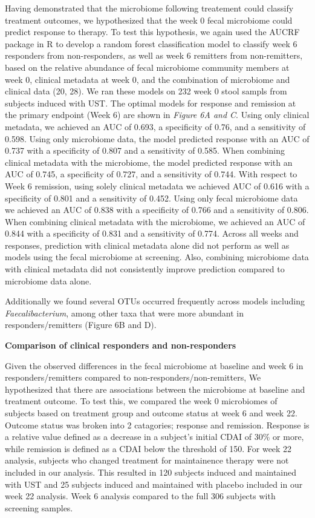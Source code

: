 \documentclass[11pt,]{article}
\begin{document}
Having demonstrated that the microbiome following treatement could
classify treatment outcomes, we hypothesized that the week 0 fecal
microbiome could predict response to therapy. To test this hypothesis,
we again used the AUCRF package in R to develop a random forest
classification model to classify week 6 responders from non-responders,
as well as week 6 remitters from non-remitters, based on the relative
abundance of fecal microbiome community members at week 0, clinical
metadata at week 0, and the combination of microbiome and clinical data
(20, 28). We ran these models on 232 week 0 stool sampls from subjects
induced with UST. The optimal models for response and remission at the
primary endpoint (Week 6) are shown in \emph{Figure 6A and C}. Using
only clinical metadata, we achieved an AUC of 0.693, a specificity of
0.76, and a sensitivity of 0.598. Using only microbiome data, the model
predicted response with an AUC of 0.737 with a specificity of 0.807 and
a sensitivity of 0.585. When combining clinical metadata with the
microbiome, the model predicted response with an AUC of 0.745, a
specificity of 0.727, and a sensitivity of 0.744. With respect to Week 6
remission, using solely clinical metadata we achieved AUC of 0.616 with
a specificity of 0.801 and a sensitivity of 0.452. Using only fecal
microbiome data we achieved an AUC of 0.838 with a specificity of 0.766
and a sensitivity of 0.806. When combining clinical metadata with the
microbiome, we achieved an AUC of 0.844 with a specificity of 0.831 and
a sensitivity of 0.774. Across all weeks and responses, prediction with
clinical metadata alone did not perform as well as models using the
fecal microbiome at screening. Also, combining microbiome data with
clinical metadata did not consistently improve prediction compared to
microbiome data alone.

Additionally we found several OTUs occurred frequently across models
including \emph{Faecalibacterium}, among other taxa that were more
abundant in responders/remitters (Figure 6B and D).

\textbf{Comparison of clinical responders and non-responders}

Given the observed differences in the fecal microbiome at baseline and
week 6 in responders/remitters compared to non-responders/non-remitters,
We hypothesized that there are associations between the microbiome at
baseline and treatment outcome. To test this, we compared the week 0
microbiomes of subjects based on treatment group and outcome status at
week 6 and week 22. Outcome status was broken into 2 catagories;
response and remission. Response is a relative value defined as a
decrease in a subject's initial CDAI of 30\% or more, while remission is
defined as a CDAI below the threshold of 150. For week 22 analysis,
subjects who changed treatment for maintainence therapy were not
included in our analysis. This resulted in 120 subjects induced and
maintained with UST and 25 subjects induced and maintained with placebo
included in our week 22 analysis. Week 6 analysis compared to the full
306 subjects with screening samples.
\end{document}
